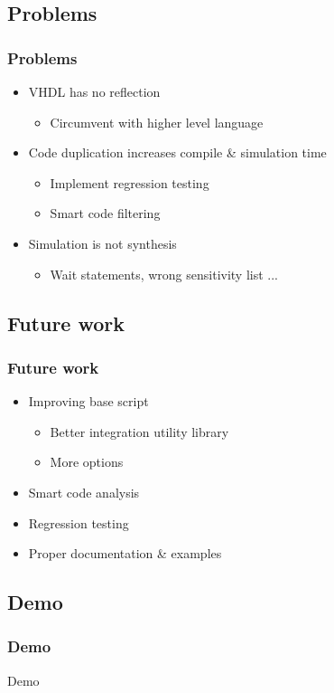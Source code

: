 \documentclass[british,10pt]{beamer}
\begin{document}
\subsection{Problems}
\begin{frame}\frametitle{Problems}
\begin{itemize}
\item VHDL has no reflection
\begin{itemize}
\item Circumvent with higher level language
\end{itemize}
\item Code duplication increases compile \& simulation time
\begin{itemize}
\item Implement regression testing
\item Smart code filtering
\end{itemize}
\item Simulation is not synthesis
\begin{itemize}
\item Wait statements, wrong sensitivity list ...
\end{itemize}
\end{itemize}
\end{frame}

\subsection{Future work}

\begin{frame}\frametitle{Future work}
\begin{itemize}
\item Improving base script
\begin{itemize}
\item Better integration utility library
\item More options
\end{itemize}
\item Smart code analysis
\item Regression testing
\item Proper documentation \& examples
\end{itemize}
\end{frame}

\subsection{Demo}

\begin{frame}\frametitle{Demo}
\centering
\Huge Demo
\end{frame}
\end{document}

